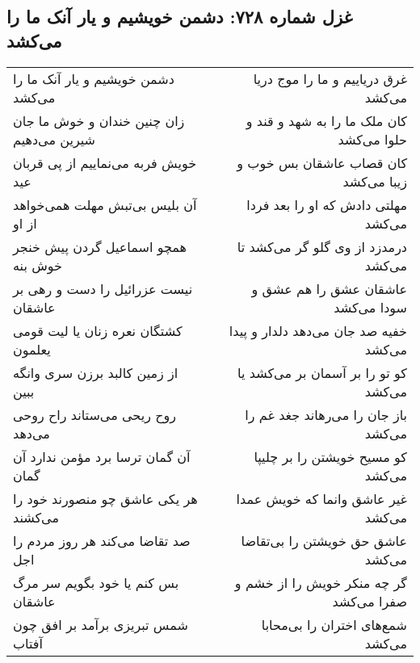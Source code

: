 \begin{center}
\section*{غزل شماره ۷۲۸: دشمن خویشیم و یار آنک ما را می‌کشد}
\label{sec:0728}
\begin{longtable}{l p{0.5cm} r}
دشمن خویشیم و یار آنک ما را می‌کشد
&&
غرق دریاییم و ما را موج دریا می‌کشد
\\
زان چنین خندان و خوش ما جان شیرین می‌دهیم
&&
کان ملک ما را به شهد و قند و حلوا می‌کشد
\\
خویش فربه می‌نماییم از پی قربان عید
&&
کان قصاب عاشقان بس خوب و زیبا می‌کشد
\\
آن بلیس بی‌تبش مهلت همی‌خواهد از او
&&
مهلتی دادش که او را بعد فردا می‌کشد
\\
همچو اسماعیل گردن پیش خنجر خوش بنه
&&
درمدزد از وی گلو گر می‌کشد تا می‌کشد
\\
نیست عزرائیل را دست و رهی بر عاشقان
&&
عاشقان عشق را هم عشق و سودا می‌کشد
\\
کشتگان نعره زنان یا لیت قومی یعلمون
&&
خفیه صد جان می‌دهد دلدار و پیدا می‌کشد
\\
از زمین کالبد برزن سری وانگه ببین
&&
کو تو را بر آسمان بر می‌کشد یا می‌کشد
\\
روح ریحی می‌ستاند راح روحی می‌دهد
&&
باز جان را می‌رهاند جغد غم را می‌کشد
\\
آن گمان ترسا برد مؤمن ندارد آن گمان
&&
کو مسیح خویشتن را بر چلیپا می‌کشد
\\
هر یکی عاشق چو منصورند خود را می‌کشند
&&
غیر عاشق وانما که خویش عمدا می‌کشد
\\
صد تقاضا می‌کند هر روز مردم را اجل
&&
عاشق حق خویشتن را بی‌تقاضا می‌کشد
\\
بس کنم یا خود بگویم سر مرگ عاشقان
&&
گر چه منکر خویش را از خشم و صفرا می‌کشد
\\
شمس تبریزی برآمد بر افق چون آفتاب
&&
شمع‌های اختران را بی‌محابا می‌کشد
\\
\end{longtable}
\end{center}
